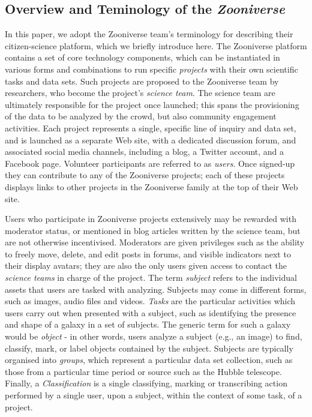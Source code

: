 \documentclass{sigchi}
\begin{document}
\subsection{Overview and Teminology of the \emph{Zooniverse}}
In this paper, we adopt the Zooniverse team's terminology for describing their citizen-science platform, which we briefly introduce here. The Zooniverse platform contains a set of core technology components, which can be instantiated in various forms and combinations to run specific \emph{projects} with their own scientific tasks and data sets. Such projects are proposed to the Zooniverse team by researchers, who become the project's \emph{science team}.  The science team are ultimately responsible for the project once launched; this spans the provisioning of the data to be analyzed by the crowd, but also community engagement activities. Each project represents a single, specific line of inquiry and data set, and is launched as a separate Web site, with a dedicated discussion forum,  and associated social media channels, including a blog, a Twitter account, and a Facebook page.  Volunteer participants are referred to as \emph{users}. Once signed-up they can contribute to any of the Zooniverse projects; each of these projects displays links to other projects in the Zooniverse family at the top of their Web site.

Users who participate in Zooniverse projects extensively may be rewarded with moderator status, or mentioned in blog articles written by the science team, but are not otherwise incentivised.  Moderators are given privileges such as the ability to freely move, delete, and edit posts in forums, and visible indicators next to their display avatars; they are also the only users given access to contact the \emph{science teams} in charge of the project. The term \emph{subject} refers to the individual assets that users are tasked with analyzing.  Subjects may come in different forms, such as images, audio files and videos. \emph{Tasks} are the particular activities which users carry out when presented with a subject, such as identifying the presence and shape of a galaxy in a set of subjects. The generic term for such a galaxy would be \emph{object} - in other words, users analyze a subject (e.g., an image) to find, classify, mark, or label objects contained by the subject. Subjects are typically organised into \emph{groups}, which represent a particular data set collection, such as those from a particular time period or source such as the Hubble telescope.  Finally, a \emph{Classification} is a single classifying, marking or transcribing action performed by a single user, upon a subject, within the context of some task, of a project.
\end{document}

